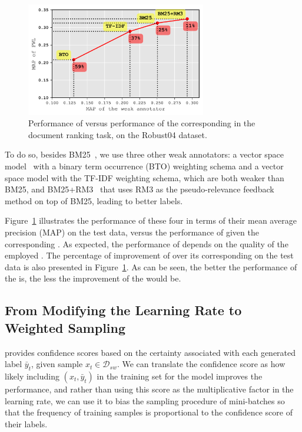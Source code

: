 \begin{figure}[t]
    \centering
    \includegraphics[width=0.7\textwidth]{03-part-02/chapter-05/figs_and_tables/plot_sensitivity_fwl.png}
    \caption{Performance of \fwl versus performance of the corresponding \wa in the document ranking task, on the Robust04 dataset.}
    \label{fig:sensitivity}
\end{figure}
To do so, besides BM25~\citep{Robertson:2009}, we use three other weak annotators: 
a vector space model~\citep{salton1973specification} with a binary term occurrence (BTO) weighting schema and a vector space model with the TF-IDF weighting schema, which are both weaker than BM25, and BM25+RM3~\citep{Abdul-jaleel:2004} that uses RM3 as the pseudo-relevance feedback method on top of BM25, leading to better labels. 

Figure~\ref{fig:sensitivity} illustrates the performance of these four \was in terms of their mean average precision (MAP) on the test data, versus the performance of \fwl given the corresponding \wa. As expected, the performance of \fwl depends on the quality of the employed \wa.
The percentage of improvement of \fwl over its corresponding \wa on the test data is also presented in Figure~\ref{fig:sensitivity}. As can be seen, the better the performance of the \wa is, the less the improvement of the \fwl would be. 


\subsection{From Modifying the Learning Rate to Weighted Sampling}
\fwl provides confidence scores based on the certainty associated with each generated label $\bar{y}_t$, given sample $x_t \in \mathcal{D}_{sw}$. We can translate the confidence score as how likely including $(x_t,\bar{y}_t)$ in the training set for the \std model improves the performance, and rather than using this score as the multiplicative factor in the learning rate, we can use it to bias the sampling procedure of mini-batches so that the frequency of training samples is proportional to the confidence score of their labels.

